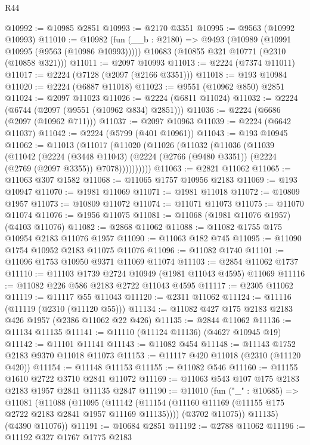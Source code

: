 \begin{lexlean}{R44}
\begin{coremodule}
@10992 := @10985 @2851
@10993 := @2170 @3351
@10995 := @9563 (@10992 @10993)
@11010 := @10982
    (fun (__b : @2180) => @9493 (@10989 (@10991 @10995 (@9563 (@10986 @10993)))))
    @10683
    (@10855 @321 @10771 (@2310 (@10858 @321)))
@11011 := @2097 @10993
@11013 := @2224 (@7374 @11011)
@11017 := @2224 (@7128 (@2097 (@2166 @3351)))
@11018 := @193 @10984
@11020 := @2224 (@6887 @11018)
@11023 := @9551 (@10962 @850) @2851
@11024 := @2097 @11023
@11026 := @2224 (@6811 @11024)
@11032 := @2224 (@6744 (@2097 (@9551 (@10962 @834) @2851)))
@11036 := @2224 (@6686 (@2097 (@10962 @711)))
@11037 := @2097 @10963
@11039 := @2224 (@6642 @11037)
@11042 := @2224 (@5799 (@401 @10961))
@11043 := @193 @10945
@11062 := @11013
    (@11017
      (@11020
        (@11026
          (@11032
            (@11036
              (@11039
                (@11042
                  (@2224
                    (@3448 @11043)
                    (@2224 (@2766 (@9480 @3351)) (@2224 (@2769 (@2097 @3355)) @7078))))))))))
@11063 := @2821 @11062
@11065 := @11063 @307 @1582
@11068 := @11065 @1757 @10956 @2183
@11069 := @193 @10947
@11070 := @1981 @11069
@11071 := @1981 @11018
@11072 := @10809 @1957
@11073 := @10809 @11072
@11074 := @11071 @11073
@11075 := @11070 @11074
@11076 := @1956 @11075
@11081 := @11068 (@1981 @11076 @1957) (@4103 @11076)
@11082 := @2868 @11062
@11088 := @11082 @1755 @175 @10954 @2183 @11076 @1957
@11090 := @11063 @182 @745
@11095 := @11090 @1754 @10952 @2183 @11075 @11076
@11096 := @11082 @1740
@11101 := @11096 @1753 @10950 @9371 @11069 @11074
@11103 := @2854 @11062 @1737
@11110 := @11103 @1739 @2724 @10949 (@1981 @11043 @4595) @11069
@11116 := @11082 @226 @586 @2183 @2722 @11043 @4595
@11117 := @2305 @11062
@11119 := @11117 @55 @11043
@11120 := @2311 @11062
@11124 := @11116 (@11119 (@2310 (@11120 @55)))
@11134 := @11082 @427 @175 @2183 @2183 @426 @1957 (@2386 @11062 @22 @426)
@11135 := @2844 @11062
@11136 := @11134 @11135
@11141 := @11110 (@11124 @11136) (@4627 @10945 @19)
@11142 := @11101 @11141
@11143 := @11082 @454
@11148 := @11143 @1752 @2183 @9370 @11018 @11073
@11153 := @11117 @420 @11018 (@2310 (@11120 @420))
@11154 := @11148 @11153
@11155 := @11082 @546
@11160 := @11155 @1610 @2722 @3710 @2841 @11072
@11169 := @11063 @543 @107 @175 @2183 @2183 @1957 @2841 @11135 @2847
@11190 := @11010
    (fun ("_" : @10685) =>
    @11081
      (@11088
        (@11095
          (@11142 (@11154 (@11160 @11169 (@11155 @175 @2722 @2183 @2841 @1957 @11169 @11135))))
          (@3702 @11075))
        @11135)
      (@4390 @11076))
@11191 := @10684 @2851
@11192 := @2788 @11062
@11196 := @11192 @327 @1767 @1775 @2183

\end{coremodule}
\end{lexlean}
